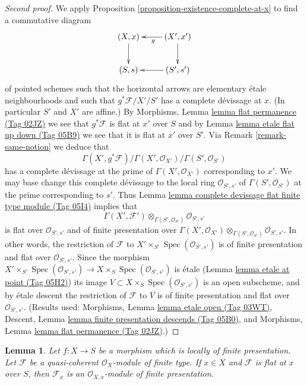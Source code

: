\documentclass{amsart}
\theoremstyle{plain}
\newtheorem{lemma}[subsection]{Lemma}
\theoremstyle{definition}
\theoremstyle{remark}
\numberwithin{equation}{subsection}
\def\Spec{\mathop{\mathrm{Spec}}}
\begin{document}
\begin{proof}[Second proof]
We apply
Proposition \ref{proposition-existence-complete-at-x}
to find a commutative diagram
$$
\xymatrix{
(X, x) \ar[d] & (X', x') \ar[l]^g \ar[d] \\
(S, s) & (S', s') \ar[l]
}
$$
of pointed schemes such that the horizontal
arrows are elementary \'etale neighbourhoods
and such that $g^*\mathcal{F}/X'/S'$ has a complete
d\'evissage at $x$.
(In particular $S'$ and $X'$ are affine.) By
Morphisms, Lemma \href{https://stacks.math.columbia.edu/tag/02JZ}{lemma flat permanence (Tag 02JZ)}
we see that $g^*\mathcal{F}$ is flat at $x'$ over $S$ and by
Lemma \href{https://stacks.math.columbia.edu/tag/05B9}{lemma etale flat up down (Tag 05B9)}
we see that it is flat at $x'$ over $S'$. Via
Remark \ref{remark-same-notion}
we deduce that
$$
\Gamma(X', g^*\mathcal{F})/
\Gamma(X', \mathcal{O}_{X'})/
\Gamma(S', \mathcal{O}_{S'})
$$
has a complete d\'evissage at the prime of $\Gamma(X', \mathcal{O}_{X'})$
corresponding to $x'$. We may base change this complete
d\'evissage to the local ring $\mathcal{O}_{S', s'}$
of $\Gamma(S', \mathcal{O}_{S'})$ at the prime corresponding to
$s'$. Thus
Lemma \href{https://stacks.math.columbia.edu/tag/05I4}{lemma complete devissage flat finite type module (Tag 05I4)}
implies that
$$
\Gamma(X', \mathcal{F}')
\otimes_{\Gamma(S', \mathcal{O}_{S'})}
\mathcal{O}_{S', s'}
$$
is flat over $\mathcal{O}_{S', s'}$ and of finite presentation over
$\Gamma(X', \mathcal{O}_{X'})
\otimes_{\Gamma(S', \mathcal{O}_{S'})} \mathcal{O}_{S', s'}$.
In other words, the restriction of $\mathcal{F}$ to
$X' \times_{S'} \Spec(\mathcal{O}_{S', s'})$
is of finite presentation and flat over $\mathcal{O}_{S', s'}$.
Since the morphism
$X' \times_{S'} \Spec(\mathcal{O}_{S', s'})
\to X \times_S \Spec(\mathcal{O}_{S', s'})$
is \'etale
(Lemma \href{https://stacks.math.columbia.edu/tag/05H2}{lemma etale at point (Tag 05H2)})
its image $V \subset X \times_S \Spec(\mathcal{O}_{S', s'})$
is an open subscheme, and by \'etale descent the restriction
of $\mathcal{F}$ to $V$ is of finite presentation and flat over
$\mathcal{O}_{S', s'}$. (Results used:
Morphisms, Lemma \href{https://stacks.math.columbia.edu/tag/03WT}{lemma etale open (Tag 03WT)},
Descent, Lemma \href{https://stacks.math.columbia.edu/tag/05B0}{lemma finite presentation descends (Tag 05B0)}, and
Morphisms, Lemma \href{https://stacks.math.columbia.edu/tag/02JZ}{lemma flat permanence (Tag 02JZ)}.)
\end{proof}


\begin{lemma}
\label{lemma-finite-type-flat-at-point-local}
Let $f : X \to S$ be a morphism which is locally of finite presentation.
Let $\mathcal{F}$ be a quasi-coherent $\mathcal{O}_X$-module of finite type.
If $x \in X$ and $\mathcal{F}$ is flat at $x$ over $S$, then
$\mathcal{F}_x$ is an $\mathcal{O}_{X, x}$-module of finite presentation.
\end{lemma}
\end{document}
